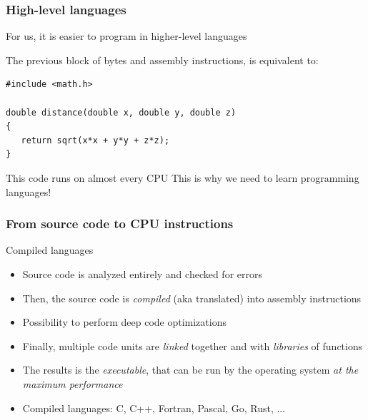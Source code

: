 \documentclass{beamer}
\begin{document}
\begin{frame}[fragile]
  \frametitle{High-level languages}
  \begin{block}{}
  For us, it is easier to program in higher-level languages
  \end{block}
  \vspace{1cm}
  The previous block of bytes and assembly instructions, is
  equivalent to:
  \begin{lstlisting}
#include <math.h>

double distance(double x, double y, double z)
{
   return sqrt(x*x + y*y + z*z);
}
  \end{lstlisting}\pause
  \begin{block}{This code runs on almost every CPU}
  This is why we need to learn programming languages!
  \end{block}
\end{frame}

\begin{frame}[fragile]
  \frametitle{From source code to CPU instructions}
  \begin{block}{Compiled languages}
  \begin{itemize}
  \item Source code is analyzed entirely and checked for errors\pause
  \item Then, the source code is \emph{compiled} (aka translated) into assembly instructions\pause
  \item Possibility to perform deep code optimizations\pause
  \item Finally, multiple code units are \emph{linked} together and with
        \emph{libraries} of functions\pause
  \item The results is the \emph{executable}, that can be run by the operating system
        \emph{at the maximum performance}\pause
  \item Compiled languages: C, C++, Fortran, Pascal, Go, Rust, ...
  \end{itemize}
  \end{block}
\end{frame}
\end{document}
